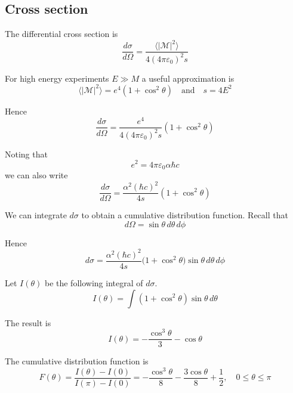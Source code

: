 \documentclass[12pt]{article}
\begin{document}
\subsection*{Cross section}
The differential cross section is
\begin{equation*}
\frac{d\sigma}{d\Omega}
=\frac{\langle|\mathcal{M}|^2\rangle}{4(4\pi\varepsilon_0)^2s}
\end{equation*}

For high energy experiments $E\gg M$ a useful approximation is
\begin{equation*}
\langle|\mathcal{M}|^2\rangle=e^4\left(1+\cos^2\theta\right)
\quad\text{and}\quad
s=4E^2
\end{equation*}

Hence
\begin{equation*}
\frac{d\sigma}{d\Omega}=\frac{e^4}{4(4\pi\varepsilon_0)^2s}\left(1+\cos^2\theta\right)
\end{equation*}

Noting that
\begin{equation*}
e^2=4\pi\varepsilon_0\alpha\hbar c
\end{equation*}
we can also write
\begin{equation*}
\frac{d\sigma}{d\Omega}=\frac{\alpha^2(\hbar c)^2}{4s}\left(1+\cos^2\theta\right)
\end{equation*}

We can integrate $d\sigma$ to obtain a cumulative distribution function.
Recall that
\begin{equation*}
d\Omega=\sin\theta\,d\theta\,d\phi
\end{equation*}

Hence
\begin{equation*}
d\sigma=\frac{\alpha^2(\hbar c)^2}{4s}\big(1+\cos^2\theta\big)\sin\theta\,d\theta\,d\phi
\end{equation*}

Let $I(\theta)$ be the following integral of $d\sigma$.
\begin{equation*}
I(\theta)=\int\left(1+\cos^2\theta\right)\sin\theta\,d\theta
\end{equation*}

The result is
\begin{equation*}
I(\theta)=-\frac{\cos^3\theta}{3}-\cos\theta
\end{equation*}

The cumulative distribution function is
\begin{equation*}
F(\theta)=\frac{I(\theta)-I(0)}{I(\pi)-I(0)}
=-\frac{\cos^3\theta}{8}-\frac{3\cos\theta}{8}+\frac{1}{2},
\quad
0\le\theta\le\pi
\end{equation*}
\end{document}
